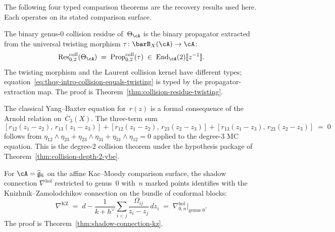 The following four typed comparison theorems are the recovery results
used here. Each operates on its stated comparison surface.

\begin{theorem}[Collision residue $=$ twisting morphism;
\ClaimStatusConditional]
\label{thm:thqg-intro-collision-twisting}
The binary genus-$0$ collision residue of~$\Theta_\cA$ is the
binary propagator extracted from the universal twisting morphism
$\tau \colon \barB_X(\cA) \to \cA$:
\begin{equation}\label{eq:thqg-intro-collision-equals-twisting}
\operatorname{Res}^{\mathrm{coll}}_{0,2}(\Theta_\cA)
\;=\;
\operatorname{Prop}^{\mathrm{coll}}_{0,2}(\tau)
\;\in\;
\mathrm{End}_{\cA}(2)[\![z^{-1}]\!].
\end{equation}
The twisting morphism and the Laurent collision kernel have different
types; equation~\eqref{eq:thqg-intro-collision-equals-twisting} is
typed by the propagator-extraction map.
The proof is Theorem~\textup{\ref{thm:collision-residue-twisting}}.
\end{theorem}

\begin{theorem}
\label{thm:thqg-intro-arnold-cybe}
The classical Yang--Baxter equation for~$r(z)$ is a formal consequence
of the Arnold relation on~$\overline{C}_3(X)$. The three-term sum
\[
[r_{12}(z_1 - z_2),\, r_{13}(z_1 - z_3)]
+ [r_{12}(z_1 - z_2),\, r_{23}(z_2 - z_3)]
+ [r_{13}(z_1 - z_3),\, r_{23}(z_2 - z_3)]
\;=\; 0
\]
follows from
$\eta_{12} \wedge \eta_{23} + \eta_{23} \wedge \eta_{31}
+ \eta_{31} \wedge \eta_{12} = 0$
applied to the degree-$3$ MC equation.
This is the degree-$2$ collision theorem under the hypothesis package of
Theorem~\textup{\ref{thm:collision-depth-2-ybe}}.
\end{theorem}

\begin{theorem}
\label{thm:thqg-intro-shadow-kz}
For $\cA = \widehat{\mathfrak g}_k$ on the affine Kac--Moody
comparison surface, the shadow connection $\nabla^{\mathrm{hol}}$
restricted to genus~$0$ with~$n$ marked points identifies with the
Knizhnik--Zamolodchikov connection on the bundle of conformal blocks:
\[
\nabla^{\mathrm{KZ}}
\;=\;
d - \frac{1}{k+h^\vee}
 \sum_{i < j} \frac{\Omega_{ij}}{z_i - z_j}\,dz_i
\;=\;
\nabla^{\mathrm{hol}}_{0,n}\big|_{\text{genus $0$}}.
\]
The proof is Theorem~\textup{\ref{thm:shadow-connection-kz}}.
\end{theorem}

